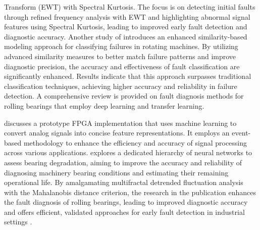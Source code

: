 \documentclass[sn-basic,pdflatex]{sn-jnl}
\theoremstyle{remark}
\theoremstyle{definition}
\begin{document}
Transform (EWT) with Spectral Kurtosis. The focus is on detecting
initial faults through refined frequency analysis with EWT and
highlighting abnormal signal features using Spectral Kurtosis, leading
to improved early fault detection and diagnostic accuracy. Another study
of \citet{hakim2023systematic} introduces an enhanced similarity-based
modeling approach for classifying failures in rotating machines. By
utilizing advanced similarity measures to better match failure patterns
and improve diagnostic precision, the accuracy and effectiveness of
fault classification are significantly enhanced. Results indicate that
this approach surpasses traditional classification techniques, achieving
higher accuracy and reliability in failure detection. A comprehensive
review is provided on fault diagnosis methods for rolling bearings that
employ deep learning and transfer learning.

\citet{WOS:000345844100102} discusses a prototype FPGA implementation
that uses machine learning to convert analog signals into concise
feature representations. It employs an event-based methodology to
enhance the efficiency and accuracy of signal processing across various
applications. \citet{WOS:000396580800080} explores a dedicated hierarchy
of neural networks to assess bearing degradation, aiming to improve the
accuracy and reliability of diagnosing machinery bearing conditions and
estimating their remaining operational life. By amalgamating
multifractal detrended fluctuation analysis with the Mahalanobis
distance criterion, the research in the publication enhances the fault
diagnosis of rolling bearings, leading to improved diagnostic accuracy
and offers efficient, validated approaches for early fault detection in
industrial settings \citep{WOS:000320835800016}.
\end{document}

